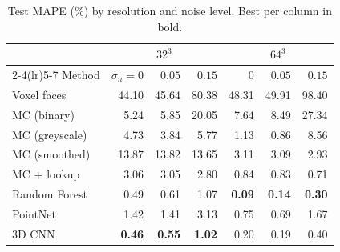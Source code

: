\begin{table}[t]
  \centering\footnotesize
  \caption{Test MAPE (\%) by resolution and noise level. Best per column in bold.}
  \label{tab:noise}
  \setlength{\tabcolsep}{3.5pt}
  \begin{tabular}{lrrrrrr}
    \toprule
    & \multicolumn{3}{c}{$32^3$} & \multicolumn{3}{c}{$64^3$} \\
    \cmidrule(lr){2-4}\cmidrule(lr){5-7}
    Method & $\sigma_n{=}0$ & $0.05$ & $0.15$ & $0$ & $0.05$ & $0.15$ \\
    \midrule
    Voxel faces & 44.10 & 45.64 & 80.38 & 48.31 & 49.91 & 98.40 \\
    MC (binary) & 5.24 & 5.85 & 20.05 & 7.64 & 8.49 & 27.34 \\
    MC (greyscale) & 4.73 & 3.84 & 5.77 & 1.13 & 0.86 & 8.56 \\
    MC (smoothed) & 13.87 & 13.82 & 13.65 & 3.11 & 3.09 & 2.93 \\
    \midrule
    MC + lookup & 3.06 & 3.05 & 2.80 & 0.84 & 0.83 & 0.71 \\
    Random Forest & 0.49 & 0.61 & 1.07 & \textbf{0.09} & \textbf{0.14} & \textbf{0.30} \\
    PointNet & 1.42 & 1.41 & 3.13 & 0.75 & 0.69 & 1.67 \\
    3D CNN & \textbf{0.46} & \textbf{0.55} & \textbf{1.02} & 0.20 & 0.19 & 0.40 \\
    \bottomrule
  \end{tabular}
\end{table}

